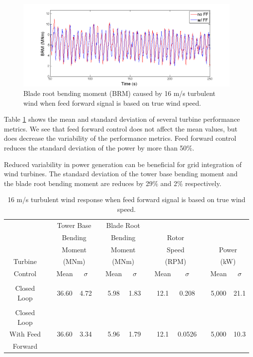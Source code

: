 \begin{figure}[htb]
	\centering
		\includegraphics[width = \linewidth]{Figures/ch3Figures/fig3-23.png}
		
	\caption{Blade root bending moment (BRM) caused by 16 m/s turbulent wind when feed forward signal is based on true wind speed.}
	\label{fig3-23}
\end{figure}

Table \ref{Table3-2} shows the mean and standard deviation of several turbine performance metrics. We see that feed forward control does not affect the mean values, but does decrease the variability of the performance metrics. Feed forward control reduces the standard deviation of the power by more than 50$\%$. 

Reduced variability in power generation can be beneficial for grid integration of wind turbines. The standard deviation of the tower base bending moment and the blade root bending moment are reduces by 29$\%$ and 2$\%$ respectively. 

\begin{table}
\centering
\begin{tabular}{ c | c c c c c c c c c c c c}
\hline
\hline
	& & \multicolumn{2}{c}{Tower Base}	& & \multicolumn{2}{c}{Blade Root}		& & \\
	& & \multicolumn{2}{c}{Bending}	& & \multicolumn{2}{c}{Bending}		& &\multicolumn{2}{c}{Rotor}	& & \\
	& & \multicolumn{2}{c}{Moment}	& & \multicolumn{2}{c}{Moment}		& &\multicolumn{2}{c}{Speed}		& &\multicolumn{2}{c}{Power} \\	
Turbine					& & \multicolumn{2}{c}{(MNm)}  					& & \multicolumn{2}{c}{(MNm)}	& & \multicolumn{2}{c}{(RPM)}	& & \multicolumn{2}{c}{(kW)}\\
\cline{3-4} \cline{6-7} \cline{9-10} \cline{12-13} 
Control & & Mean & $\sigma$ & & Mean & $\sigma$ & & Mean & $\sigma$  & & Mean & $\sigma$ \\
\hline
\\
Closed Loop & & 36.60 & 4.72  & & 5.98 & 1.83  && 12.1 & 0.208 && 5,000  & 21.1 \\
 \\
Closed Loop \\
With Feed   & & 36.60 & 3.34  & & 5.96 & 1.79 && 12.1 & 0.0526  && 5,000  & 10.3 \\
Forward\\
\hline
\hline
\end{tabular}
\caption{16 m/s turbulent wind response when feed forward signal is based on true wind speed.}
\label{Table3-2}
\end{table}


